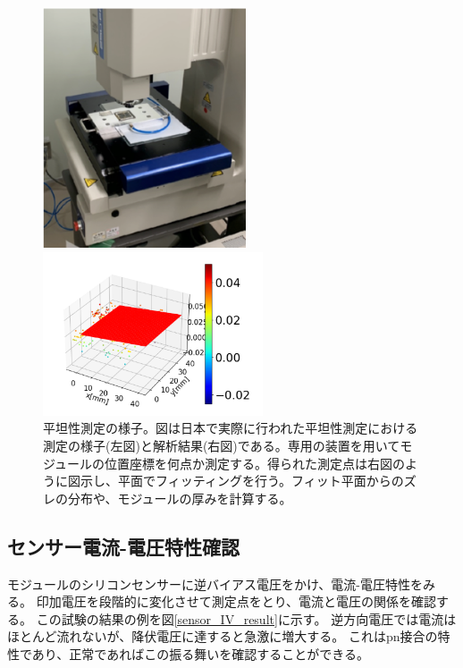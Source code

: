 \begin{figure}[bpt]\centering
  \begin{minipage}{0.4\hsize}
    \begin{center}
    \includegraphics[width=60mm]{Metrology_setup}
    \end{center}
  \end{minipage}
  \begin{minipage}{0.4\hsize}
    \begin{center}
    \includegraphics[width=65mm]{Metrology_analysis}
    \end{center}
  \end{minipage}
  \caption[平坦性測定の様子。]{平坦性測定の様子。図は日本で実際に行われた平坦性測定における測定の様子(左図)と解析結果(右図)である。専用の装置を用いてモジュールの位置座標を何点か測定する。得られた測定点は右図のように図示し、平面でフィッティングを行う。フィット平面からのズレの分布や、モジュールの厚みを計算する。}
  \label{Metrology_overview}
\end{figure}

\clearpage
\subsection{センサー電流-電圧特性確認}
モジュールのシリコンセンサーに逆バイアス電圧をかけ、電流-電圧特性をみる。
印加電圧を段階的に変化させて測定点をとり、電流と電圧の関係を確認する。
この試験の結果の例を図\ref{sensor_IV_result}に示す。
逆方向電圧では電流はほとんど流れないが、降伏電圧に達すると急激に増大する。
これはpn接合の特性\cite{2-1}であり、正常であればこの振る舞いを確認することができる。

